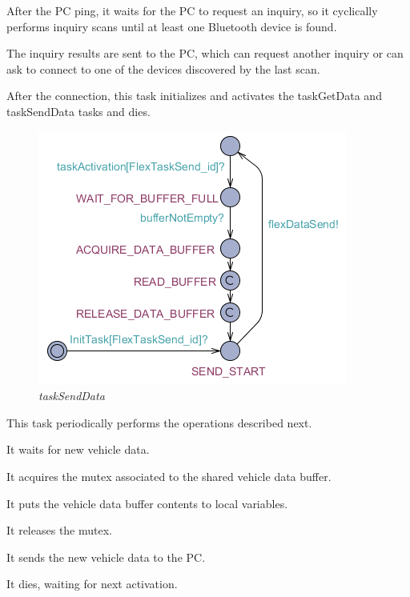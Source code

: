 \documentclass[paper=a4, fontsize=11pt]{scrartcl} %
\numberwithin{equation}{section} %
\numberwithin{figure}{section} %
\numberwithin{table}{section} %
\begin{document}
After the PC ping, it waits for the PC to request an inquiry, so it cyclically performs inquiry scans until at least one Bluetooth device is found.

The inquiry results are sent to the PC, which can request another inquiry or can ask to connect to one of the devices discovered by the last scan.

After the connection, this task initializes and activates the taskGetData and taskSendData tasks and dies.

\begin{figure}[H]
  \centering
  \includegraphics[width=4in]{img/FLEX-PC_taskSendData}
  \caption{\textit{taskSendData}}
\end{figure}

This task periodically performs the operations described next.

It waits for new vehicle data.

It acquires the mutex associated to the shared vehicle data buffer.

It puts the vehicle data buffer contents to local variables.

It releases the mutex.

It sends the new vehicle data to the PC.

It dies, waiting for next activation.
\end{document}
